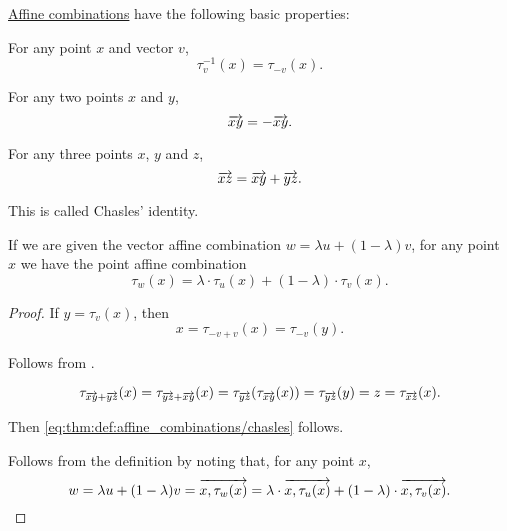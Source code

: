 \begin{proposition}\label{thm:def:affine_combinations}
  \hyperref[def:affine_combinations]{Affine combinations} have the following basic properties:
  \begin{thmenum}
     For any point \( x \) and vector \( v \),
    \begin{equation*}
      \tau_v^{-1}(x) = \tau_{-v}(x).
    \end{equation*}

     For any two points \( x \) and \( y \),
    \begin{equation*}
      \overrightarrow{xy} = -\overrightarrow{xy}.
    \end{equation*}

     For any three points \( x \), \( y \) and \( z \),
    \begin{equation}\label{eq:thm:def:affine_combinations/chasles}
      \overrightarrow{xz} = \overrightarrow{xy} + \overrightarrow{yz}.
    \end{equation}

    This is called Chasles' identity.

     If we are given the vector affine combination \( w = \lambda u + (1 - \lambda) v \), for any point \( x \) we have the point affine combination
    \begin{equation*}
      \tau_w(x) = \lambda \cdot \tau_u(x) + (1 - \lambda) \cdot \tau_v(x).
    \end{equation*}
  \end{thmenum}
\end{proposition}
\begin{proof}
   If \( y = \tau_v(x) \), then
  \begin{equation*}
    x = \tau_{-v + v}(x) = \tau_{-v}(y).
  \end{equation*}

   Follows from .

  \begin{equation*}
    \tau_{\overrightarrow{xy} + \overrightarrow{yz}}(x)
    =
    \tau_{\overrightarrow{yz} + \overrightarrow{xy}}(x)
    =
    \tau_{\overrightarrow{yz}}(\tau_{\overrightarrow{xy}}(x))
    =
    \tau_{\overrightarrow{yz}}(y)
    =
    z
    =
    \tau_{\overrightarrow{xz}}(x).
  \end{equation*}

  Then \eqref{eq:thm:def:affine_combinations/chasles} follows.

   Follows from the definition by noting that, for any point \( x \),
  \begin{equation*}
    w = \lambda u + (1 - \lambda) v
    =
    \overrightarrow{x, \tau_w(x)} = \lambda \cdot \overrightarrow{x, \tau_u(x)} + (1 - \lambda) \cdot \overrightarrow{x, \tau_v(x)}.
  \end{equation*}
\end{proof}

